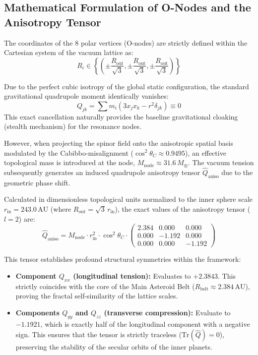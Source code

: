 \documentclass[11pt,a4paper]{article}
\theoremstyle{remark}
\newcommand{\AU}{\,\mathrm{AU}}
\newcommand{\Mearth}{\,M_\oplus}
\begin{document}
\subsection{Mathematical Formulation of O-Nodes and the Anisotropy Tensor}

The coordinates of the 8 polar vertices (O-nodes) are strictly defined within the Cartesian system of the vacuum lattice as:
\begin{equation}
    R_i \in \left\{ \left( \pm \frac{R_{\text{out}}}{\sqrt{3}}, \pm \frac{R_{\text{out}}}{\sqrt{3}}, \pm \frac{R_{\text{out}}}{\sqrt{3}} \right) \right\}
\end{equation}

Due to the perfect cubic isotropy of the global static configuration, the standard gravitational quadrupole moment identically vanishes:
\begin{equation}
    Q_{jk} = \sum m_i(3x_j x_k - r^2 \delta_{jk}) \equiv 0
\end{equation}
This exact cancellation naturally provides the baseline gravitational cloaking (stealth mechanism) for the resonance nodes.

However, when projecting the spinor field onto the anisotropic spatial basis modulated by the Cabibbo-misalignment ($\cos^2 \theta_C \approx 0.9495$), an effective topological mass is introduced at the node, $M_{\text{node}} \approx 31.6\Mearth$. The vacuum tension subsequently generates an induced quadrupole anisotropy tensor $\hat{Q}_{\text{aniso}}$ due to the geometric phase shift.

Calculated in dimensionless topological units normalized to the inner sphere scale $r_{\text{in}} = 243.0\AU$ (where $R_{\text{out}} = \sqrt{3} \, r_{\text{in}}$), the exact values of the anisotropy tensor ($l=2$) are:
\begin{equation}
    \hat{Q}_{\text{aniso}} = M_{\text{node}} \cdot r_{\text{in}}^2 \cdot \cos^2 \theta_C \cdot 
    \begin{pmatrix}
    2.384 & 0.000 & 0.000 \\
    0.000 & -1.192 & 0.000 \\
    0.000 & 0.000 & -1.192
    \end{pmatrix}
\end{equation}

This tensor establishes profound structural symmetries within the framework:
\begin{itemize}[leftmargin=2em]
    \item \textbf{Component $Q_{xx}$ (longitudinal tension):} Evaluates to $+2.3843$. This strictly coincides with the core of the Main Asteroid Belt ($R_{\text{belt}} \approx 2.384\AU$), proving the fractal self-similarity of the lattice scales.
    \item \textbf{Components $Q_{yy}$ and $Q_{zz}$ (transverse compression):} Evaluate to $-1.1921$, which is exactly half of the longitudinal component with a negative sign. This ensures that the tensor is strictly traceless ($\text{Tr}(\hat{Q}) = 0$), preserving the stability of the secular orbits of the inner planets.
\end{itemize}
\end{document}
